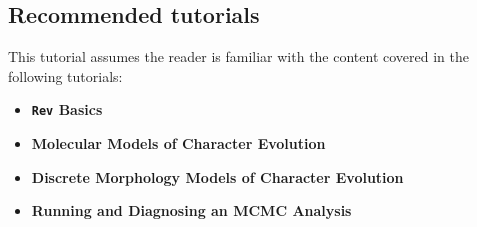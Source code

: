 \subsection*{Recommended tutorials}

This tutorial assumes the reader is familiar with the content covered in the following \RevBayes tutorials:

\begin{itemize}
\item {\bf {\tt \large Rev} Basics}
\item {\bf Molecular Models of Character Evolution}
\item {\bf Discrete Morphology Models of Character Evolution}
\item {\bf Running and Diagnosing an MCMC Analysis}
\end{itemize}

\newpage
